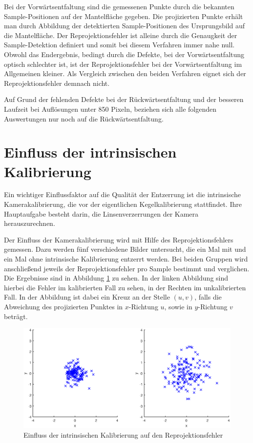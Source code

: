 Bei der Vorwärtsentfaltung sind die gemessenen Punkte durch die bekannten Sample-Positionen auf der Mantelfläche gegeben. Die projizierten Punkte erhält man durch Abbildung der detektierten Sample-Positionen des Ursprungsbild auf die Mantelfläche. Der Reprojektionsfehler ist alleine durch die Genaugkeit der Sample-Detektion definiert und somit bei diesem Verfahren immer nahe null.
Obwohl das Endergebnis, bedingt durch die Defekte, bei der Vorwärtsentfaltung optisch schlechter ist, ist der Reprojektionsfehler bei der Vorwärtsentfaltung im Allgemeinen kleiner.
Als Vergleich zwischen den beiden Verfahren eignet sich der Reprojektionsfehler demnach nicht.

Auf Grund der fehlenden Defekte bei der Rückwärtsentfaltung und der besseren Laufzeit bei Auflösungen unter 850 Pixeln, beziehen sich alle folgenden Auswertungen nur noch auf die Rückwärtsentfaltung.


\section{Einfluss der intrinsischen Kalibrierung}
Ein wichtiger Einflussfaktor auf die Qualität der Entzerrung ist die intrinsische Kamerakalibrierung, die vor der eigentlichen Kegelkalibrierung stattfindet. Ihre Hauptaufgabe besteht darin, die Linsenverzerrungen der Kamera herauszurechnen.

Der Einfluss der Kamerakalibrierung wird mit Hilfe des Reprojektionsfehlers gemessen. Dazu werden fünf verschiedene Bilder untersucht, die ein Mal mit und ein Mal ohne intrinsische Kalibrierung entzerrt werden. Bei beiden Gruppen wird anschließend jeweils der Reprojektionsfehler pro Sample bestimmt und verglichen. Die Ergebnisse sind in Abbildung \ref{fig:influenceCalib} zu sehen. In der linken Abbildung sind hierbei die Fehler im kalibrierten Fall zu sehen, in der Rechten im unkalibrierten Fall. In der Abbildung ist dabei ein Kreuz an der Stelle $(u,v)$, falls die Abweichung des projizierten Punktes in $x$-Richtung $u$, sowie in $y$-Richtung $v$ beträgt.

\begin{figure}[!htb]
	\centering
	\includegraphics[width=\textwidth]{images/reprojectionErrorReverse.eps}
	\caption{Einfluss der intrinsischen Kalibrierung auf den Reprojektionsfehler}
	\label{fig:influenceCalib}
\end{figure}



